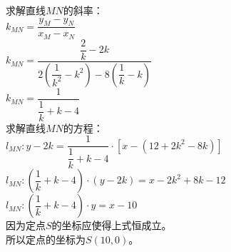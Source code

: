 \documentclass[UTF8]{ctexart}
\begin{document}
\begin{multicols}{2}
        求解直线$MN$的斜率：\\[4mm]
        $k_{MN}=\dfrac{y_M-y_N}{x_M-x_N}$\\[5mm]
        $k_{MN}=\dfrac{\dfrac{2}{k}-2k }{2(\dfrac{1}{k^2}-k^2 )-8(\dfrac{1}{k}-k)}$\\[5mm]
        $k_{MN}=\dfrac{1}{\dfrac{1}{k}+k-4} $\\[8mm]
        求解直线$MN$的方程：\\[4mm]
        $l_{MN}:y-2k=\dfrac{1}{\dfrac{1}{k}+k -4}\cdot [x-(12+2k^2-8k)]$\\[5mm]
        $l_{MN}:(\dfrac{1}{k}+k -4)\cdot(y-2k)=x-2k^2+8k-12$\\[5mm]
        $l_{MN}:(\dfrac{1}{k}+k -4)\cdot y=x-10$\\[8mm]
        因为定点$S$的坐标应使得上式恒成立。\\[3mm]
        所以定点的坐标为$S(10,0)$。
        \newpage
    \end{multicols}


\newpage
\end{document}
